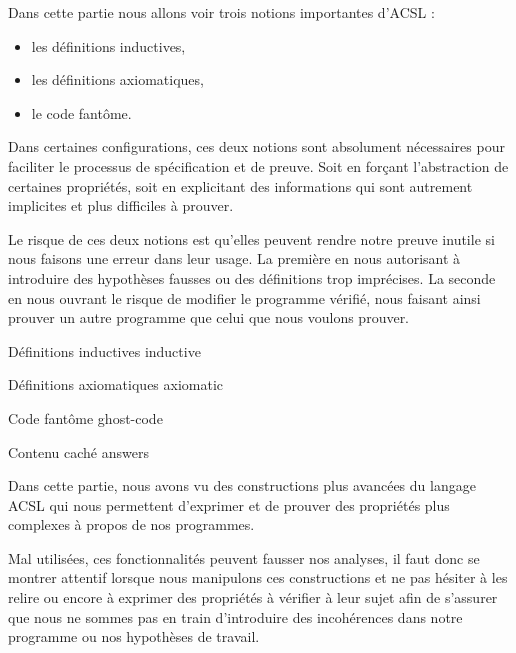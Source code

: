 Dans cette partie nous allons voir trois notions importantes d'ACSL :



\begin{itemize}
\item les définitions inductives,
\item les définitions axiomatiques,
\item le code fantôme.
\end{itemize}


Dans certaines configurations, ces deux notions sont absolument nécessaires pour
faciliter le processus de spécification et de preuve. Soit en forçant
l'abstraction de certaines propriétés, soit en explicitant des informations qui
sont autrement implicites et plus difficiles à prouver.



Le risque de ces deux notions est qu'elles peuvent rendre notre preuve inutile si
nous faisons une erreur dans leur usage. La première en nous autorisant à
introduire des hypothèses fausses ou des définitions trop imprécises. La seconde
en nous ouvrant le risque de modifier le programme vérifié, nous faisant
ainsi prouver un autre programme que celui que nous voulons prouver.


\begin{levelTwo}
  {Définitions inductives}
  {inductive}
\end{levelTwo}


\begin{levelTwo}
  {Définitions axiomatiques}
  {axiomatic}
\end{levelTwo}


\begin{levelTwo}
  {Code fantôme}
  {ghost-code}
\end{levelTwo}


\begin{levelTwo}
  {Contenu caché}
  {answers}
\end{levelTwo}


\horizontalLine
\newpage


Dans cette partie, nous avons vu des constructions plus avancées du langage ACSL
qui nous permettent d'exprimer et de prouver des propriétés plus complexes à
propos de nos programmes.



Mal utilisées, ces fonctionnalités peuvent fausser nos analyses, il faut donc se
montrer attentif lorsque nous manipulons ces constructions et ne pas hésiter à
les relire ou encore à exprimer des propriétés à vérifier à leur sujet afin de
s'assurer que nous ne sommes pas en train d'introduire des incohérences dans
notre programme ou nos hypothèses de travail.
